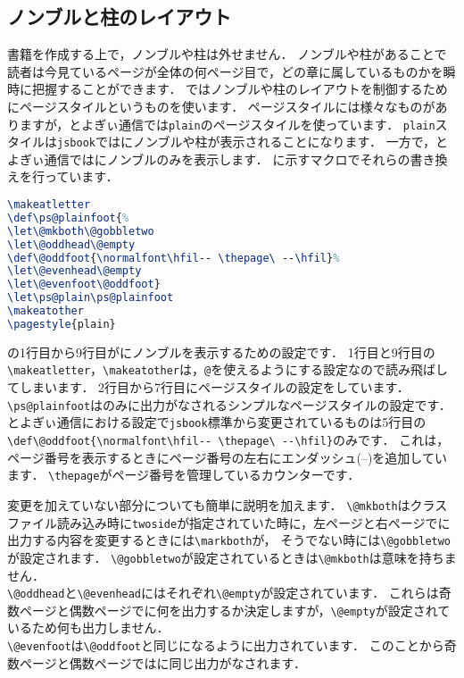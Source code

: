 \subsection{ノンブルと柱のレイアウト}

書籍を作成する上で，ノンブルや柱は外せません．
ノンブルや柱があることで読者は今見ているページが全体の何ページ目で，どの章に属しているものかを瞬時に把握することができます．
{\pLaTeX}ではノンブルや柱のレイアウトを制御するためにページスタイルというものを使います．
ページスタイルには様々なものがありますが，とよぎぃ通信では\verb|plain|のページスタイルを使っています．
\texttt{plain}スタイルは\texttt{jsbook}ではにノンブルや柱が表示されることになります．
一方で，とよぎぃ通信ではにノンブルのみを表示します．
に示すマクロでそれらの書き換えを行っています．

\begin{lstlisting}[caption = ノンブルと柱のレイアウト, label = list:footer, language=tex]
\makeatletter
\def\ps@plainfoot{%
\let\@mkboth\@gobbletwo
\let\@oddhead\@empty
\def\@oddfoot{\normalfont\hfil-- \thepage\ --\hfil}%
\let\@evenhead\@empty
\let\@evenfoot\@oddfoot}
\let\ps@plain\ps@plainfoot
\makeatother
\pagestyle{plain}
\end{lstlisting}

の1行目から9行目がにノンブルを表示するための設定です．
1行目と9行目の\verb|\makeatletter|，\verb|\makeatother|は，\texttt{@}を使えるようにする設定なので読み飛ばしてしまいます．
2行目から7行目にページスタイルの設定をしています．
\verb|\ps@plainfoot|はのみに出力がなされるシンプルなページスタイルの設定です．
とよぎぃ通信における設定で\verb|jsbook|標準から変更されているものは5行目の\verb|\def\@oddfoot{\normalfont\hfil-- \thepage\ --\hfil}|のみです．
これは，ページ番号を表示するときにページ番号の左右にエンダッシュ(--)を追加しています．
\verb|\thepage|がページ番号を管理しているカウンターです．

変更を加えていない部分についても簡単に説明を加えます．
\verb|\@mkboth|はクラスファイル読み込み時に\texttt{twoside}が指定されていた時に，左ページと右ページでに出力する内容を変更するときには\verb|\markboth|が，
そうでない時には\verb|\@gobbletwo|が設定されます．
\verb|\@gobbletwo|が設定されているときは\verb|\@mkboth|は意味を持ちません．\\
\verb|\@oddhead|と\verb|\@evenhead|にはそれぞれ\verb|\@empty|が設定されています．
これらは奇数ページと偶数ページでに何を出力するか決定しますが，\verb|\@empty|が設定されているため何も出力しません．\\
\verb|\@evenfoot|は\verb|\@oddfoot|と同じになるように出力されています．
このことから奇数ページと偶数ページではに同じ出力がなされます．

